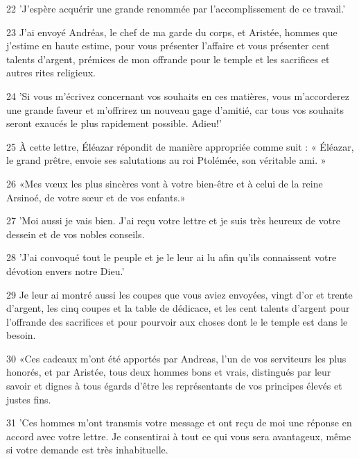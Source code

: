 \par 22 'J'espère acquérir une grande renommée par l'accomplissement de ce travail.'

\par 23 J'ai envoyé Andréas, le chef de ma garde du corps, et Aristée, hommes que j'estime en haute estime, pour vous présenter l'affaire et vous présenter cent talents d'argent, prémices de mon offrande pour le temple et les sacrifices et autres rites religieux.

\par 24 'Si vous m'écrivez concernant vos souhaits en ces matières, vous m'accorderez une grande faveur et m'offrirez un nouveau gage d'amitié, car tous vos souhaits seront exaucés le plus rapidement possible. Adieu!'

\par 25 À cette lettre, Éléazar répondit de manière appropriée comme suit : « Éléazar, le grand prêtre, envoie ses salutations au roi Ptolémée, son véritable ami. »

\par 26 «Mes vœux les plus sincères vont à votre bien-être et à celui de la reine Arsinoé, de votre sœur et de vos enfants.»

\par 27 'Moi aussi je vais bien. J'ai reçu votre lettre et je suis très heureux de votre dessein et de vos nobles conseils.

\par 28 'J'ai convoqué tout le peuple et je le leur ai lu afin qu'ils connaissent votre dévotion envers notre Dieu.'

\par 29 Je leur ai montré aussi les coupes que vous aviez envoyées, vingt d'or et trente d'argent, les cinq coupes et la table de dédicace, et les cent talents d'argent pour l'offrande des sacrifices et pour pourvoir aux choses dont le le temple est dans le besoin.

\par 30 «Ces cadeaux m'ont été apportés par Andreas, l'un de vos serviteurs les plus honorés, et par Aristée, tous deux hommes bons et vrais, distingués par leur savoir et dignes à tous égards d'être les représentants de vos principes élevés et justes fins.

\par 31 'Ces hommes m'ont transmis votre message et ont reçu de moi une réponse en accord avec votre lettre. Je consentirai à tout ce qui vous sera avantageux, même si votre demande est très inhabituelle.

